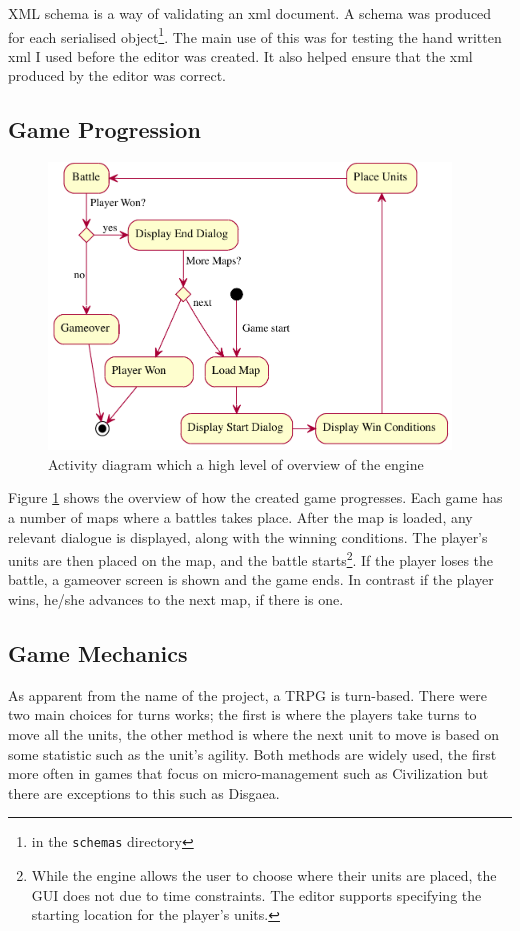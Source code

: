 XML schema is a way of validating an  xml document. A schema was produced for each serialised object\footnote{in the \texttt{schemas} directory}. 
The main use of this was for testing the hand written xml I used before the editor was created. It also helped ensure that the xml produced by the editor was correct.  

\subsection{Game Progression}
\begin{figure}[htbp]
	\centering
		\includegraphics[height=3in]{figures/game.pdf}
	\caption{Activity diagram which a high level of overview of the engine}
	\label{fig:figures_game}
\end{figure}

Figure \ref{fig:figures_game} shows the overview of how the created game progresses.  Each game has a number of maps where a battles takes place. After the map is loaded, any relevant dialogue is displayed, along with the winning conditions. The player's units are then placed on the map, and the battle starts\footnote{While the engine allows the user to choose where their units are placed, the GUI does not due to time constraints. The editor supports specifying the starting location for the player's units.}. If the player loses the battle, a gameover screen is shown and the game ends. In contrast if the player wins, he/she advances to the next map, if there is one.    

\subsection{Game Mechanics}
As apparent from the name of the project, a TRPG is turn-based.  There were two main choices for turns works; the first is where the players take turns to move all the units, the other method is where the next unit to move is based on some statistic such as the unit's agility. Both methods are widely used,  the first more often in games that focus on micro-management such as Civilization but there are exceptions to this such as Disgaea. 

